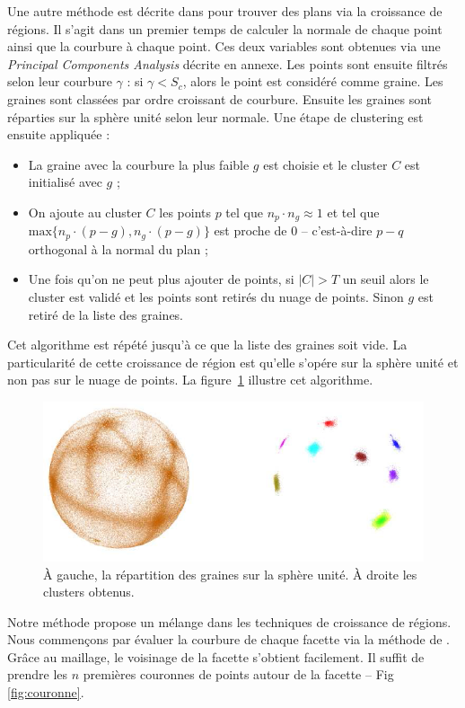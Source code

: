 ﻿\documentclass[12pt, twoside]{article}
\begin{document}
Une autre méthode est décrite dans \cite{reggrow3} pour trouver des plans via la croissance de régions. Il s'agit dans un premier temps de calculer la normale de chaque point ainsi que la courbure à chaque point. Ces deux variables sont obtenues via une \textit{Principal Components Analysis} décrite en annexe. Les points sont ensuite filtrés selon leur courbure $\gamma$ : si $\gamma < S_c$, alors le point est considéré comme graine. Les graines sont classées par ordre croissant de courbure. Ensuite les graines sont réparties sur la sphère unité selon leur normale. Une étape de clustering est ensuite appliquée :
\begin{itemize}
  \item La graine avec la courbure la plus faible $g$ est choisie et le cluster $C$ est initialisé avec $g$ ;
  \item On ajoute au cluster $C$ les points $p$ tel que $n_p\cdot n_g \approx 1$ et tel que $\text{max}\{n_p\cdot(p-g), n_g\cdot(p-g)\}$ est proche de 0 -- c'est-à-dire $p-q$ orthogonal à la normal du plan ;
  \item Une fois qu'on ne peut plus ajouter de points, si $\vert C\vert > T$ un seuil alors le cluster est validé et les points sont retirés du nuage de points. Sinon $g$ est retiré de la liste des graines.
\end{itemize}
Cet algorithme est répété jusqu'à ce que la liste des graines soit vide. La particularité de cette croissance de région est qu'elle s'opére sur la sphère unité et non pas sur le nuage de points. La figure~\ref{fig:GaussMap} illustre cet algorithme.

\begin{figure}[h]
\centering
\includegraphics[scale=0.65]{GaussMap.png}
\caption{\label{fig:GaussMap} À gauche, la répartition des graines sur la sphère unité. À droite les clusters obtenus.}
\end{figure}

Notre méthode propose un mélange dans les techniques de croissance de régions. Nous commençons par évaluer la courbure de chaque facette via la méthode de \cite{reggrow3}. Grâce au maillage, le voisinage de la facette s'obtient facilement. Il suffit de prendre les $n$ premières couronnes de points autour de la facette -- Fig \ref{fig:couronne}.
\end{document}
